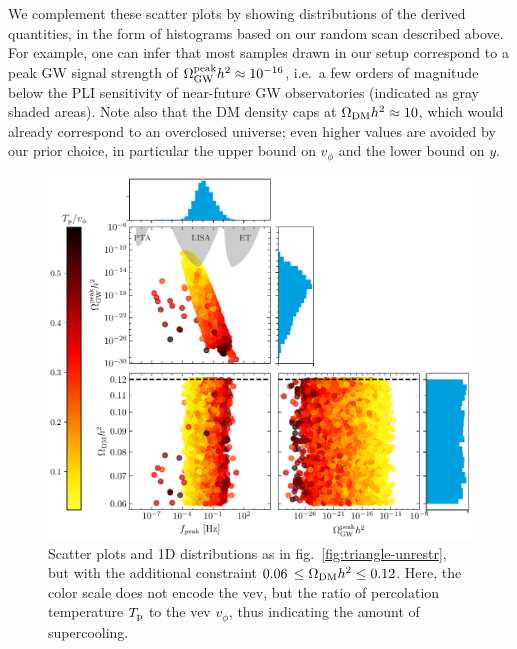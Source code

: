 We complement these scatter plots by showing distributions of the derived quantities, in the form of histograms based on our random scan described above. For example, one can infer that most samples  drawn in our setup correspond to a peak \ac{GW} signal strength of $\Omega_{\text{GW}}^{\text{peak}} h^2 \approx 10^{-16}$, i.e.~a few orders of magnitude below the \ac{PLI} sensitivity of near-future \ac{GW} observatories (indicated as gray shaded areas). Note also that the \ac{DM} density caps at $\Omega_{\text{DM}} h^2\approx10$, which would already correspond to an overclosed universe; even higher values are avoided by our prior choice, in particular the upper bound on $v_\phi$ and the lower bound on $y$.

\begin{figure}[t!]
	\centering
	\includegraphics[width=\textwidth]{thesisplots/lisa/thesis_LISA_6}
	\caption{Scatter plots and 1D distributions as in fig.~\ref{fig:triangle-unrestr}, but with the additional constraint $0.06 \, \leq \Omega_{\text{DM}} h^2 \leq 0.12$. Here, the color scale does not encode the \ac{vev}, but the ratio of percolation temperature $T_{\text{p}}$ to the \ac{vev} $v_\phi$, thus indicating the amount of supercooling.}
	\label{fig:triangle-restr}
\end{figure}

